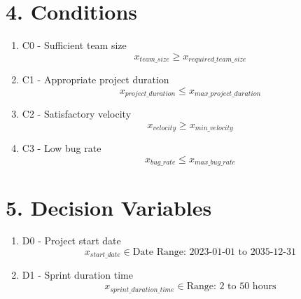 \documentclass{article}
\begin{document}
\section{4. Conditions}
\begin{enumerate}
    \item C0 - Sufficient team size
        \[
        x_{team\_size} \geq x_{required\_team\_size}
        \]
    \item C1 - Appropriate project duration
        \[
        x_{project\_duration} \leq x_{max\_project\_duration}
        \]
    \item C2 - Satisfactory velocity
        \[
        x_{velocity} \geq x_{min\_velocity}
        \]
    \item C3 - Low bug rate
        \[
        x_{bug\_rate} \leq x_{max\_bug\_rate}
        \]
\end{enumerate}

\section{5. Decision Variables}
\begin{enumerate}
    \item D0 - Project start date
        \[
        x_{start\_date} \in \text{Date Range: 2023-01-01 to 2035-12-31}
        \]
    \item D1 - Sprint duration time
        \[
        x_{sprint\_duration\_time} \in \text{Range: 2 to 50 hours}
        \]
\end{enumerate}
\end{document}
